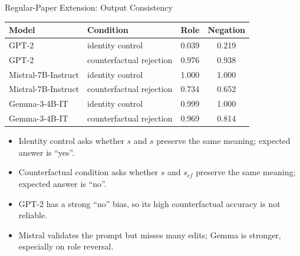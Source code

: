 \documentclass[aspectratio=169,11pt]{beamer}
\begin{document}
\begin{frame}{Regular-Paper Extension: Output Consistency}
\small
\begin{table}
\centering
\begin{tabular}{llcc}
\toprule
\textbf{Model} & \textbf{Condition} & \textbf{Role} & \textbf{Negation} \\
\midrule
GPT-2 & identity control & 0.039 & 0.219 \\
GPT-2 & counterfactual rejection & 0.976 & 0.938 \\
Mistral-7B-Instruct & identity control & 1.000 & 1.000 \\
Mistral-7B-Instruct & counterfactual rejection & 0.734 & 0.652 \\
Gemma-3-4B-IT & identity control & 0.999 & 1.000 \\
Gemma-3-4B-IT & counterfactual rejection & 0.969 & 0.814 \\
\bottomrule
\end{tabular}
\end{table}

\vspace{0.4em}
\begin{itemize}
  \item Identity control asks whether \(s\) and \(s\) preserve the same meaning; expected answer is ``yes''.
  \item Counterfactual condition asks whether \(s\) and \(s_{cf}\) preserve the same meaning; expected answer is ``no''.
  \item GPT-2 has a strong ``no'' bias, so its high counterfactual accuracy is not reliable.
  \item Mistral validates the prompt but misses many edits; Gemma is stronger, especially on role reversal.
\end{itemize}
\end{frame}
\end{document}
